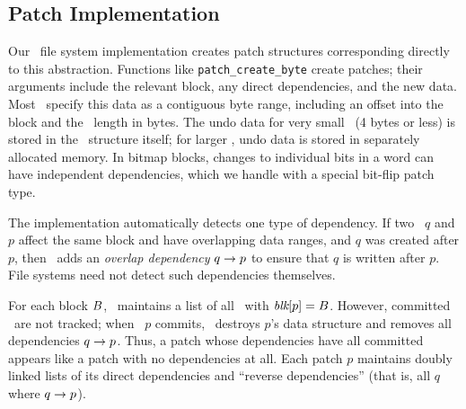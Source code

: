 
\subsection{Patch Implementation}
\label{sec:patch:noop}

Our \Kudos\ file system implementation creates patch structures
corresponding directly to this abstraction.
%
Functions like \texttt{patch\_\-create\_\-byte} create patches;
%
their arguments include the relevant block, any
direct dependencies, and the new data.
%
Most \patches\ specify this data as a contiguous byte range, including an
offset into the block and the \patch\ length in bytes.
%
The undo data for very small \patches\ (4 bytes or less) is stored in the
\patch\ structure itself; for larger \patches, undo data is stored in
separately allocated memory.
%
In bitmap blocks, changes to individual bits in a word can have independent
dependencies, which we handle with a special bit-flip patch type.


The implementation automatically detects one type of dependency.
%
If two \patches\ $q$ and $p$ affect the same block and have overlapping data
ranges, and $q$ was created after $p$, then \Kudos\ adds an \emph{overlap
dependency} $q \rightarrow p$ to ensure that $q$ is written after $p$.
%
File systems need not detect such
dependencies themselves.


For each block $B$, \Kudos\ maintains a list of all \patches\ with
$\textit{blk}[{p}] = B$.
%
However, committed \patches\ are not tracked; when
\patch\ $p$ commits, \Kudos\ destroys $p$'s data structure and removes all
dependencies $q \rightarrow p$.
%
Thus, a patch whose dependencies have all committed appears like a patch
with no dependencies at all.
%
Each patch $p$ maintains doubly linked lists of its direct dependencies
and ``reverse dependencies'' (that is, all $q$ where $q
\rightarrow p$).


